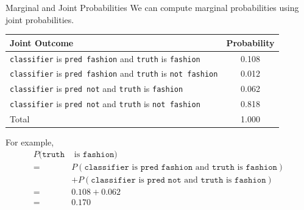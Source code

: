 \begin{frame}{Marginal and Joint Probabilities}
    We can compute marginal probabilities using joint probabilities. 
    \begin{center}
        \small
        \begin{tabular}{l c}
            Joint Outcome & Probability \\ 
            \hline
            \texttt{classifier} is \texttt{pred fashion} and \texttt{truth} is \texttt{fashion} & 0.108 \\
            \texttt{classifier} is \texttt{pred fashion} and \texttt{truth} is \texttt{not fashion} & 0.012 \\
            \texttt{classifier} is \texttt{pred not} and \texttt{truth} is \texttt{fashion} & 0.062 \\
            \texttt{classifier} is \texttt{pred not} and \texttt{truth} is \texttt{not fashion} & 0.818 \\
            \hline
            Total & 1.000 \\
            \hline 
        \end{tabular}
    \end{center}
    For example, 
    \begin{align*}
    P(\texttt{truth}& \text{ is } \texttt{fashion}) \\ 
    =& P(\texttt{classifier} \text{ is } \texttt{pred fashion} \text{ and } \texttt{truth} \text{ is } \texttt{fashion}) \\
    &+ P(\texttt{classifier} \text{ is } \texttt{pred not} \text{ and } \texttt{truth} \text{ is } \texttt{fashion}) \\
    =& 0.108 + 0.062 \\
    =& 0.170
    \end{align*}
\end{frame}

